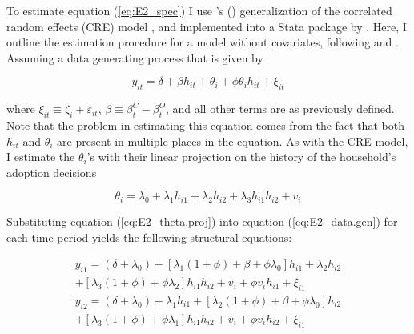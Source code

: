 \documentclass[11pt]{article}
\begin{document}
To estimate equation (\ref{eq:E2_spec}) I use \citeauthor{suri11}'s (\citeyear{suri11}) generalization of the correlated random effects (CRE) model \citep{chamberlin84}, and implemented into a Stata package by \citet{cabanillas-et.al.18}. Here, I outline the estimation procedure for a model without covariates, following \citet{michler-et.al.18} and \citet{suri11}. Assuming a data generating process that is given by

\begin{equation} \label{eq:E2_data.gen}
    y_{it} = \delta +  \beta h_{it} + \theta_{i} + \phi\theta_{i}h_{it} + \xi_{it}
\end{equation}

where $\xi_{it} \equiv \zeta_i + \varepsilon_{it}$, $\beta \equiv \beta^{C}_{t} - \beta^{O}_{t}$, and all other terms are as previously defined. Note that the problem in estimating this equation comes from the fact that both $h_{it}$ and $\theta_{i}$ are present in multiple places in the equation. As with the \citet{chamberlin84} CRE model, I estimate the $\theta_{i}$’s with their linear projection on the history of the household’s adoption decisions

\begin{equation} \label{eq:E2_theta.proj}
    \theta_{i} = \lambda_{0} +  \lambda_{1}h_{i1} + \lambda_{2}h_{i2} + \lambda_{3}h_{i1}h_{i2} + v_i
\end{equation}

Substituting equation (\ref{eq:E2_theta.proj}) into equation (\ref{eq:E2_data.gen}) for each time period yields the following structural equations:

\begin{equation} \label{eq:E2_struc1}
    \begin{split}
    y_{i1} = (\delta + \lambda_0) + [\lambda_1(1 + \phi) + \beta + \phi \lambda_0]h_{i1} + \lambda_{2}h_{i2} \\
    + [\lambda_3(1 + \phi) + \phi \lambda_2]h_{i1}h_{i2} + v_i + \phi v_{i}h_{i1} + \xi_{i1}
    \end{split}
\end{equation}
\begin{equation} \label{eq:E2_struc2}
    \begin{split}
    y_{i2} = (\delta + \lambda_0) + \lambda_{1}h_{i1} + [\lambda_2(1 + \phi) + \beta + \phi \lambda_0]h_{i2} \\
    + [\lambda_3(1 + \phi) + \phi \lambda_1]h_{i1}h_{i2} + v_i + \phi v_{i}h_{i2} + \xi_{i1}
    \end{split}
\end{equation}
\end{document}
